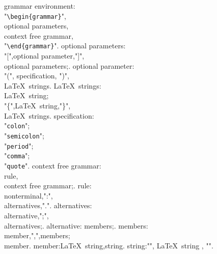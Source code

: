 \begin{grammar}
grammar environment:\\
  "\verb!\begin{grammar}!",\\
	optional parameters,\\
	 context free grammar,\\
	  "\verb!\end{grammar}!".
optional parameters:\\
  "[",optional parameter,"]",\\
   optional parameters;.
optional parameter:\\
  "(", specification, ")",\\
   \LaTeX\ strings.
\LaTeX\ strings:\\
   \LaTeX\ string;\\
   "\{",\LaTeX\ string,"\}",\\
   \LaTeX\ strings.
specification:\\
  "{\tt colon}";\\
  "{\tt semicolon}";\\
  "{\tt period}";\\
  "{\tt comma}";\\
  "{\tt quote}".
context free grammar:\\
  rule,\\
  context free grammar;.
rule:\\
  nonterminal,":",\\
  alternatives,".".
alternatives:\\
  alternative,";",\\
   alternatives;.
alternative:
  members;.
members:\\
  member,",",members;\\
  member.
member:\LaTeX\ string,string.
string:"{\tt \quotesymbol}",
  \LaTeX\ string ,
  "{\tt \quotesymbol}".
\end{grammar}
